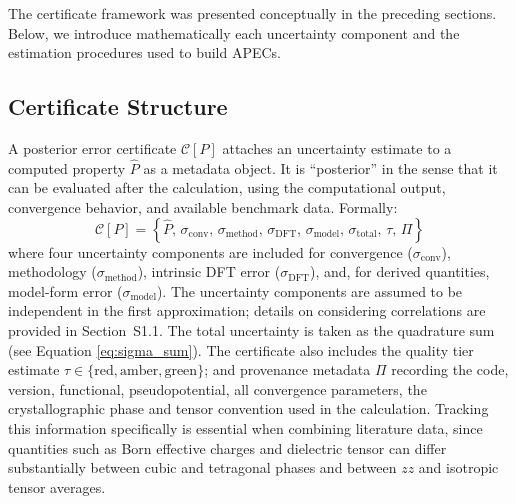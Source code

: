 \documentclass[twocolumn,superscriptaddress,amsmath,amssymb,longbibliography]{revtex4-2}
\newcommand{\conv}{\mathrm{conv}}
\newcommand{\meth}{\mathrm{method}}
\newcommand{\cert}{\mathcal{C}}
\begin{document}
The certificate framework was presented conceptually in the preceding sections. Below, we introduce mathematically each uncertainty component and the estimation procedures used to build APECs.



\subsection{Certificate Structure}
\label{sec:cert_structure}

A posterior error certificate $\cert[P]$ attaches an uncertainty estimate to a computed property $\hat{P}$ as a metadata object. It is ``posterior'' in the sense that it can be evaluated after the calculation, using
the computational output, convergence behavior,
and available benchmark data. Formally:
\begin{equation}
    \cert[P] = \left\{ \hat{P}, \, \sigma_\conv, \, \sigma_\meth, \,
    \sigma_{\mathrm{DFT}}, \, \sigma_{\mathrm{model}}, \, \sigma_{\mathrm{total}}, \,
    \tau, \, \Pi \right\}
    \label{eq:certificate}
\end{equation}
where four uncertainty
components are included for convergence ($\sigma_\conv$), methodology ($\sigma_\meth$),
intrinsic DFT error ($\sigma_{\mathrm{DFT}}$), and, for derived quantities,
model-form error ($\sigma_{\mathrm{model}}$). The uncertainty components are assumed to be independent in the first approximation; details on considering correlations are provided in  Section~S1.1. The total uncertainty is taken as the quadrature sum (see Equation \ref{eq:sigma_sum}).
The certificate also includes the quality tier estimate
$\tau \in \{\text{red}, \text{amber}, \text{green}\}$; and provenance
metadata $\Pi$ recording the code, version, functional, pseudopotential,
all convergence parameters, the
crystallographic phase and tensor convention used in the calculation.
Tracking this information specifically is essential when combining literature data, since quantities such as Born effective charges and dielectric tensor can differ substantially between cubic and tetragonal phases and between $zz$ and isotropic tensor averages.
\end{document}
